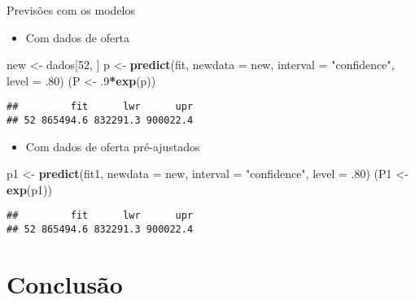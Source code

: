 \documentclass[9pt,ignorenonframetext,aspectratio=169]{beamer}
\newenvironment{Shaded}{\begin{snugshade}}{\end{snugshade}}
\newcommand{\DataTypeTok}[1]{\textcolor[rgb]{0.13,0.29,0.53}{#1}}
\newcommand{\DecValTok}[1]{\textcolor[rgb]{0.00,0.00,0.81}{#1}}
\newcommand{\FloatTok}[1]{\textcolor[rgb]{0.00,0.00,0.81}{#1}}
\newcommand{\KeywordTok}[1]{\textcolor[rgb]{0.13,0.29,0.53}{\textbf{#1}}}
\newcommand{\NormalTok}[1]{#1}
\newcommand{\OperatorTok}[1]{\textcolor[rgb]{0.81,0.36,0.00}{\textbf{#1}}}
\newcommand{\StringTok}[1]{\textcolor[rgb]{0.31,0.60,0.02}{#1}}
\providecommand{\tightlist}{%
  \setlength{\itemsep}{0pt}\setlength{\parskip}{0pt}}
\begin{document}
\begin{frame}[fragile]{Previsões com os modelos}
\protect\hypertarget{previsuxf5es-com-os-modelos}{}

\begin{itemize}
\tightlist
\item
  Com dados de oferta
\end{itemize}

\begin{Shaded}
\begin{Highlighting}[]
\NormalTok{new <-}\StringTok{ }\NormalTok{dados[}\DecValTok{52}\NormalTok{, ]}
\NormalTok{p <-}\StringTok{ }\KeywordTok{predict}\NormalTok{(fit, }\DataTypeTok{newdata =}\NormalTok{ new, }\DataTypeTok{interval =} \StringTok{"confidence"}\NormalTok{, }\DataTypeTok{level =} \FloatTok{.80}\NormalTok{)}
\NormalTok{(P <-}\StringTok{ }\FloatTok{.9}\OperatorTok{*}\KeywordTok{exp}\NormalTok{(p))}
\end{Highlighting}
\end{Shaded}

\begin{verbatim}
##         fit      lwr      upr
## 52 865494.6 832291.3 900022.4
\end{verbatim}

\begin{itemize}
\tightlist
\item
  Com dados de oferta pré-ajustados
\end{itemize}

\begin{Shaded}
\begin{Highlighting}[]
\NormalTok{p1 <-}\StringTok{ }\KeywordTok{predict}\NormalTok{(fit1, }\DataTypeTok{newdata =}\NormalTok{ new, }\DataTypeTok{interval =} \StringTok{"confidence"}\NormalTok{, }\DataTypeTok{level =} \FloatTok{.80}\NormalTok{)}
\NormalTok{(P1 <-}\StringTok{ }\KeywordTok{exp}\NormalTok{(p1))}
\end{Highlighting}
\end{Shaded}

\begin{verbatim}
##         fit      lwr      upr
## 52 865494.6 832291.3 900022.4
\end{verbatim}

\end{frame}

\hypertarget{conclusuxe3o}{%
\section{Conclusão}\label{conclusuxe3o}}
\end{document}
